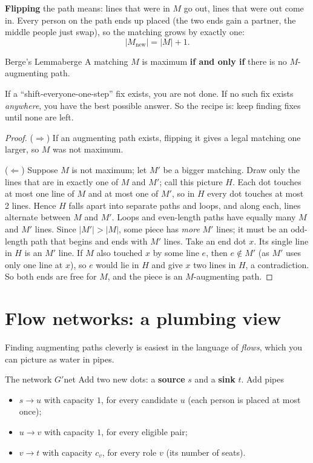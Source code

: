 \documentclass[11pt]{article}
\begin{document}
\textbf{Flipping} the path means: lines that were in $M$ go out, lines that were out come in. Every person on the path ends up placed (the two ends gain a partner, the middle people just swap), so the matching grows by exactly one:
\[
 |M_{\text{new}}| = |M| + 1 .
\]

\begin{theorem}{Berge's Lemma}{berge}
A matching $M$ is maximum \textbf{if and only if} there is no $M$-augmenting path.
\end{theorem}

\begin{plain}
If a ``shift-everyone-one-step'' fix exists, you are not done. If no such fix exists \emph{anywhere}, you have the best possible answer. So the recipe is: keep finding fixes until none are left.
\end{plain}

\begin{proof}
($\Rightarrow$) If an augmenting path exists, flipping it gives a legal matching one larger, so $M$ was not maximum.

($\Leftarrow$) Suppose $M$ is not maximum; let $M'$ be a bigger matching. Draw only the lines that are in exactly one of $M$ and $M'$; call this picture $H$. Each dot touches at most one line of $M$ and at most one of $M'$, so in $H$ every dot touches at most 2 lines. Hence $H$ falls apart into separate paths and loops, and along each, lines alternate between $M$ and $M'$. Loops and even-length paths have equally many $M$ and $M'$ lines. Since $|M'|>|M|$, some piece has \emph{more} $M'$ lines; it must be an odd-length path that begins and ends with $M'$ lines. Take an end dot $x$. Its single line in $H$ is an $M'$ line. If $M$ also touched $x$ by some line $e$, then $e\notin M'$ (as $M'$ uses only one line at $x$), so $e$ would lie in $H$ and give $x$ two lines in $H$, a contradiction. So both ends are free for $M$, and the piece is an $M$-augmenting path.
\end{proof}

\section{Flow networks: a plumbing view}\label{sec:flow}

Finding augmenting paths cleverly is easiest in the language of \emph{flows}, which you can picture as water in pipes.

\begin{definition}{The network $G'$}{net}
Add two new dots: a \textbf{source} $s$ and a \textbf{sink} $t$. Add pipes
\begin{itemize}[nosep]
 \item $s\to u$ with capacity $1$, for every candidate $u$ (each person is placed at most once);
 \item $u\to v$ with capacity $1$, for every eligible pair;
 \item $v\to t$ with capacity $c_v$, for every role $v$ (its number of seats).
\end{itemize}
\end{definition}
\end{document}
